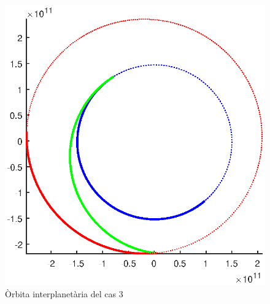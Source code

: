 \begin{figure}[H]
	\centering
	\includegraphics[scale=0.8]{./plots/cas3}
	\caption{Òrbita interplanetària del cas 3}
\end{figure}

